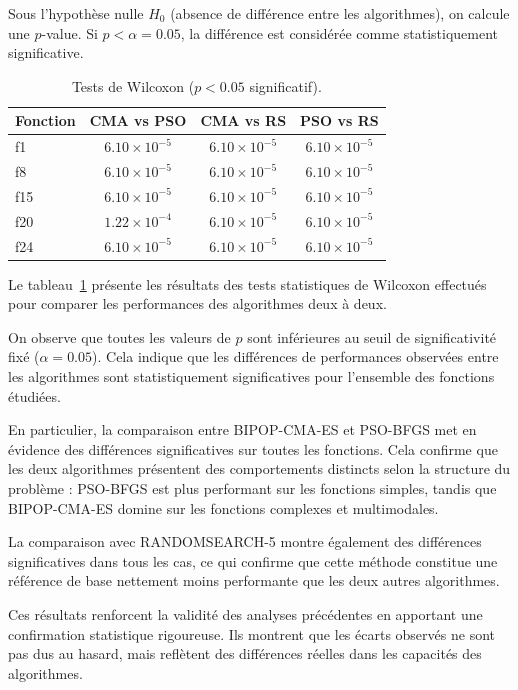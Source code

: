 \documentclass[conference]{IEEEtran}
\begin{document}
Sous l'hypoth\`ese nulle $H_0$ (absence de diff\'erence entre les algorithmes), on calcule une $p$-value. Si $p < \alpha = 0.05$, la diff\'erence est consid\'er\'ee comme statistiquement significative.

\begin{table}[H]
\centering
\caption{Tests de Wilcoxon ($p < 0.05$ significatif).}
\label{tab:wilcoxon}
\begin{tabular}{lccc}
\toprule
Fonction & CMA vs PSO & CMA vs RS & PSO vs RS \\
\midrule
f1  & $6.10 \times 10^{-5}$ & $6.10 \times 10^{-5}$ & $6.10 \times 10^{-5}$ \\
f8  & $6.10 \times 10^{-5}$ & $6.10 \times 10^{-5}$ & $6.10 \times 10^{-5}$ \\
f15 & $6.10 \times 10^{-5}$ & $6.10 \times 10^{-5}$ & $6.10 \times 10^{-5}$ \\
f20 & $1.22 \times 10^{-4}$ & $6.10 \times 10^{-5}$ & $6.10 \times 10^{-5}$ \\
f24 & $6.10 \times 10^{-5}$ & $6.10 \times 10^{-5}$ & $6.10 \times 10^{-5}$ \\
\bottomrule
\end{tabular}
\end{table}

Le tableau~\ref{tab:wilcoxon} pr\'esente les r\'esultats des tests statistiques de Wilcoxon effectu\'es pour comparer les performances des algorithmes deux \`a deux.

On observe que toutes les valeurs de $p$ sont inf\'erieures au seuil de significativit\'e fix\'e ($\alpha = 0.05$). Cela indique que les diff\'erences de performances observ\'ees entre les algorithmes sont statistiquement significatives pour l'ensemble des fonctions \'etudi\'ees.

En particulier, la comparaison entre BIPOP-CMA-ES et PSO-BFGS met en \'evidence des diff\'erences significatives sur toutes les fonctions. Cela confirme que les deux algorithmes pr\'esentent des comportements distincts selon la structure du probl\`eme : PSO-BFGS est plus performant sur les fonctions simples, tandis que BIPOP-CMA-ES domine sur les fonctions complexes et multimodales.

La comparaison avec RANDOMSEARCH-5 montre \'egalement des diff\'erences significatives dans tous les cas, ce qui confirme que cette m\'ethode constitue une r\'ef\'erence de base nettement moins performante que les deux autres algorithmes.

Ces r\'esultats renforcent la validit\'e des analyses pr\'ec\'edentes en apportant une confirmation statistique rigoureuse. Ils montrent que les \'ecarts observ\'es ne sont pas dus au hasard, mais refl\`etent des diff\'erences r\'eelles dans les capacit\'es des algorithmes.
\end{document}
